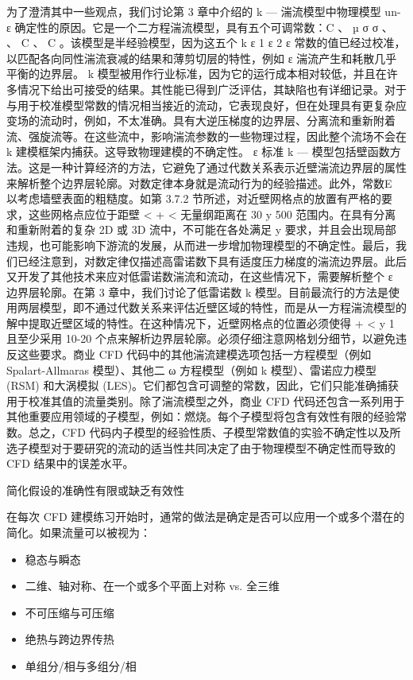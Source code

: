 \documentclass[11pt,a4paper,openany,fontset=none]{ctexbook}
\begin{document}
为了澄清其中一些观点，我们讨论第 3 章中介绍的 k — 湍流模型中物理模型 un- ε 确定性的原因。它是一个二方程湍流模型，具有五个可调常数：C 、 µ σ σ 、 、 C 、 C 。该模型是半经验模型，因为这五个 k ε 1 ε 2 ε 常数的值已经过校准，以匹配各向同性湍流衰减的结果和薄剪切层的特性，例如 ε 湍流产生和耗散几乎平衡的边界层。 k 模型被用作行业标准，因为它的运行成本相对较低，并且在许多情况下给出可接受的结果。其性能已得到广泛评估，其缺陷也有详细记录。对于与用于校准模型常数的情况相当接近的流动，它表现良好，但在处理具有更复杂应变场的流动时，例如，不太准确。具有大逆压梯度的边界层、分离流和重新附着流、强旋流等。在这些流中，影响湍流参数的一些物理过程，因此整个流场不会在 k 建模框架内捕获。这导致物理建模的不确定性。 ε 标准 k — 模型包括壁函数方法。这是一种计算经济的方法，它避免了通过代数关系表示近壁湍流边界层的属性来解析整个边界层轮廓。对数定律本身就是流动行为的经验描述。此外，常数E
以考虑墙壁表面的粗糙度。如第 3.7.2 节所述，对近壁网格点的放置有严格的要求，这些网格点应位于距壁 < + < 无量纲距离在 30 y 500 范围内。在具有分离和重新附着的复杂 2D 或 3D 流中，不可能在各处满足 y 要求，并且会出现局部违规，也可能影响下游流的发展，从而进一步增加物理模型的不确定性。最后，我们已经注意到，对数定律仅描述高雷诺数下具有适度压力梯度的湍流边界层。此后又开发了其他技术来应对低雷诺数湍流和流动，在这些情况下，需要解析整个 ε 边界层轮廓。在第 3 章中，我们讨论了低雷诺数 k 模型。目前最流行的方法是使用两层模型，即不通过代数关系来评估近壁区域的特性，而是从一方程湍流模型的解中提取近壁区域的特性。在这种情况下，近壁网格点的位置必须使得 + < y 1 且至少采用 10-20 个点来解析边界层轮廓。必须仔细注意网格划分细节，以避免违反这些要求。商业 CFD 代码中的其他湍流建模选项包括一方程模型（例如 Spalart-Allmaras 模型）、其他二 ω 方程模型（例如 k 模型）、雷诺应力模型 (RSM) 和大涡模拟 (LES)。它们都包含可调整的常数，因此，它们只能准确捕获用于校准其值的流量类别。除了湍流模型之外，商业 CFD 代码还包含一系列用于其他重要应用领域的子模型，例如：燃烧。每个子模型将包含有效性有限的经验常数。总之，CFD 代码内子模型的经验性质、子模型常数值的实验不确定性以及所选子模型对于要研究的流动的适当性共同决定了由于物理模型不确定性而导致的 CFD 结果中的误差水平。

简化假设的准确性有限或缺乏有效性

在每次 CFD 建模练习开始时，通常的做法是确定是否可以应用一个或多个潜在的简化。如果流量可以被视为：

\begin{itemize}

\item 稳态与瞬态

\item 二维、轴对称、在一个或多个平面上对称 vs. 全三维

\item 不可压缩与可压缩

\item 绝热与跨边界传热

\item 单组分/相与多组分/相

\end{itemize}
\end{document}
